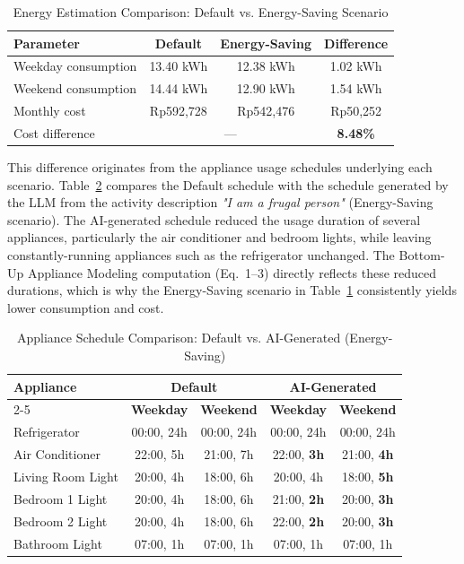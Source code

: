 \documentclass[conference]{IEEEtran}
\begin{document}
\begin{table}[htbp]
\caption{Energy Estimation Comparison: Default vs. Energy-Saving Scenario}
\label{tab:energy}
\begin{center}
\begin{tabular}{|l|c|c|c|}
\hline
\textbf{Parameter} & \textbf{Default} & \textbf{Energy-Saving} & \textbf{Difference} \\
\hline
Weekday consumption & 13.40 kWh & 12.38 kWh & 1.02 kWh \\
\hline
Weekend consumption & 14.44 kWh & 12.90 kWh & 1.54 kWh \\
\hline
Monthly cost & Rp592,728 & Rp542,476 & Rp50,252 \\
\hline
Cost difference & \multicolumn{2}{c|}{---} & \textbf{8.48\%} \\
\hline
\end{tabular}
\end{center}
\end{table}

This difference originates from the appliance usage schedules underlying each scenario. Table~\ref{tab:schedule} compares the Default schedule with the schedule generated by the LLM from the activity description \textit{"I am a frugal person"} (Energy-Saving scenario). The AI-generated schedule reduced the usage duration of several appliances, particularly the air conditioner and bedroom lights, while leaving constantly-running appliances such as the refrigerator unchanged. The Bottom-Up Appliance Modeling computation (Eq.~1--3) directly reflects these reduced durations, which is why the Energy-Saving scenario in Table~\ref{tab:energy} consistently yields lower consumption and cost.

\begin{table}[htbp]
\caption{Appliance Schedule Comparison: Default vs. AI-Generated (Energy-Saving)}
\label{tab:schedule}
\begin{center}
\begin{tabular}{|l|c|c|c|c|}
\hline
\multirow{2}{*}{\textbf{Appliance}} & \multicolumn{2}{c|}{\textbf{Default}} & \multicolumn{2}{c|}{\textbf{AI-Generated}} \\
\cline{2-5}
 & \textbf{Weekday} & \textbf{Weekend} & \textbf{Weekday} & \textbf{Weekend} \\
\hline
Refrigerator & 00:00, 24h & 00:00, 24h & 00:00, 24h & 00:00, 24h \\
\hline
Air Conditioner & 22:00, 5h & 21:00, 7h & 22:00, \textbf{3h} & 21:00, \textbf{4h} \\
\hline
Living Room Light & 20:00, 4h & 18:00, 6h & 20:00, 4h & 18:00, \textbf{5h} \\
\hline
Bedroom 1 Light & 20:00, 4h & 18:00, 6h & 21:00, \textbf{2h} & 20:00, \textbf{3h} \\
\hline
Bedroom 2 Light & 20:00, 4h & 18:00, 6h & 22:00, \textbf{2h} & 20:00, \textbf{3h} \\
\hline
Bathroom Light & 07:00, 1h & 07:00, 1h & 07:00, 1h & 07:00, 1h \\
\hline
\end{tabular}
\end{center}
\end{table}
\end{document}
